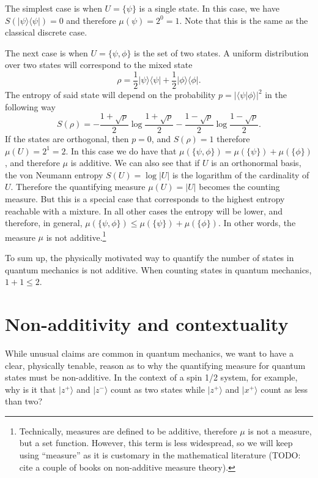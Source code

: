 \documentclass[10pt,twocolumn, nofootinbib]{revtex4-2}
\def\>{\rangle}
\def\<{\langle}
\begin{document}
The simplest case is when $U = \{ \psi \}$ is a single state. In this case, we have $S(|\psi\>\<\psi|) = 0$ and therefore $\mu({\psi}) = 2^{0} = 1$. Note that this is the same as the classical discrete case.

The next case is when $U = \{ \psi, \phi \}$ is the set of two states. A uniform distribution over two states will correspond to the mixed state
\begin{equation}
	\rho = \frac{1}{2} |\psi\>\<\psi| + \frac{1}{2} |\phi\>\<\phi|.
\end{equation}
The entropy of said state will depend on the probability $p=|\<\psi | \phi \>|^2$ in the following way
\begin{equation}
	S(\rho) = - \frac{1+\sqrt{p}}{2} \log \frac{1+\sqrt{p}}{2} 
	- \frac{1-\sqrt{p}}{2} \log \frac{1-\sqrt{p}}{2}.
\end{equation}
If the states are orthogonal, then $p=0$, and $S(\rho) = 1$ therefore $\mu(U) = 2^1 = 2$. In this case we do have that $\mu(\{ \psi, \phi \}) = \mu(\{\psi\}) + \mu(\{\phi\})$, and therefore $\mu$ is additive. We can also see that if $U$ is an orthonormal basis, the von Neumann entropy $S(U) = \log |U|$ is the logarithm of the cardinality of $U$. Therefore the quantifying measure $\mu(U) = |U|$ becomes the counting measure. But this is a special case that corresponds to the highest entropy reachable with a mixture. In all other cases the entropy will be lower, and therefore, in general, $\mu(\{ \psi, \phi \}) \leq \mu(\{\psi\}) + \mu(\{\phi\})$. In other words, the measure $\mu$ is not additive.\footnote{Technically, measures are defined to be additive, therefore $\mu$ is not a measure, but a set function. However, this term is less widespread, so we will keep using ``measure'' as it is customary in the mathematical literature (TODO: cite a couple of books on non-additive measure theory).}

To sum up, the physically motivated way to quantify the number of states in quantum mechanics is not additive. When counting states in quantum mechanics, $1+1 \leq 2$.

\section{Non-additivity and contextuality}

While unusual claims are common in quantum mechanics, we want to have a clear, physically tenable, reason as to why the quantifying measure for quantum states must be non-additive. In the context of a spin 1/2 system, for example, why is it that $|z^+\>$ and $|z^-\>$ count as two states while $|z^+\>$ and $|x^+\>$ count as less than two?
\end{document}
